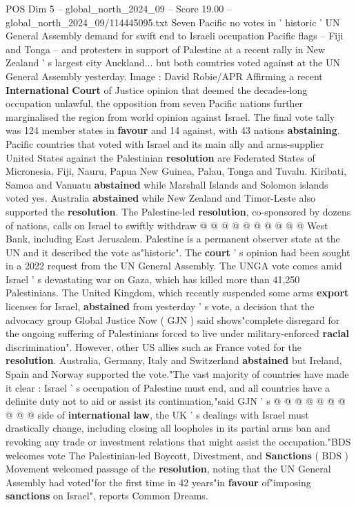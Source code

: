 \begin{textsample}{POS Dim 5 – global\_north\_2024\_09 – Score 19.00 – global\_north\_2024\_09/114445095.txt}  \label{ex:f5_pos_312}
Seven Pacific no votes in ' historic ' UN General Assembly demand for swift end to Israeli occupation Pacific flags -- Fiji and Tonga -- and protesters in support of Palestine at a recent rally in New Zealand ' s largest city Auckland... but both countries voted against at the UN General Assembly yesterday.
Image : David Robie/APR Affirming a recent \textbf{International} \textbf{Court} of Justice opinion that deemed the decades-long occupation unlawful, the opposition from seven Pacific nations further marginalised the region from world opinion against Israel.
The final vote tally was 124 member states in \textbf{favour} and 14 against, with 43 nations \textbf{abstaining}.
Pacific countries that voted with Israel and its main ally and arms-supplier United States against the Palestinian \textbf{resolution} are Federated States of Micronesia, Fiji, Nauru, Papua New Guinea, Palau, Tonga and Tuvalu.
Kiribati, Samoa and Vanuatu \textbf{abstained} while Marshall Islands and Solomon islands voted yes.
Australia \textbf{abstained} while New Zealand and Timor-Leste also supported the \textbf{resolution}.
The Palestine-led \textbf{resolution}, co-sponsored by dozens of nations, calls on Israel to swiftly withdraw @ @ @ @ @ @ @ @ @ @ West Bank, including East Jerusalem.
Palestine is a permanent observer state at the UN and it described the vote as"historic".
The \textbf{court} ' s opinion had been sought in a 2022 request from the UN General Assembly.
The UNGA vote comes amid Israel ' s devastating war on Gaza, which has killed more than 41,250 Palestinians.
The United Kingdom, which recently suspended some arms \textbf{export} licenses for Israel, \textbf{abstained} from yesterday ' s vote, a decision that the advocacy group Global Justice Now ( GJN ) said shows"complete disregard for the ongoing suffering of Palestinians forced to live under military-enforced \textbf{racial} discrimination".
However, other US allies such as France voted for the \textbf{resolution}.
Australia, Germany, Italy and Switzerland \textbf{abstained} but Ireland, Spain and Norway supported the vote."The vast majority of countries have made it clear : Israel ' s occupation of Palestine must end, and all countries have a definite duty not to aid or assist its continuation,"said GJN ' s @ @ @ @ @ @ @ @ @ @ side of \textbf{international} \textbf{law}, the UK ' s dealings with Israel must drastically change, including closing all loopholes in its partial arms ban and revoking any trade or investment relations that might assist the occupation."BDS welcomes vote The Palestinian-led Boycott, Divestment, and \textbf{Sanctions} ( BDS ) Movement welcomed passage of the \textbf{resolution}, noting that the UN General Assembly had voted"for the first time in 42 years"in \textbf{favour} of"imposing \textbf{sanctions} on Israel", reports Common Dreams.

\end{textsample}
